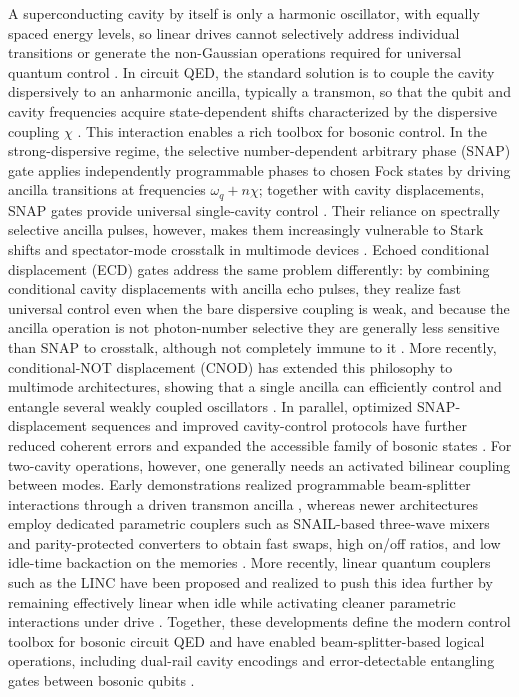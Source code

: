 A superconducting cavity by itself is only a harmonic oscillator, with equally spaced energy levels, so linear drives cannot selectively address individual transitions or generate the non-Gaussian operations required for universal quantum control \cite{Blais2021,Ma2021}. In circuit QED, the standard solution is to couple the cavity dispersively to an anharmonic ancilla, typically a transmon, so that the qubit and cavity frequencies acquire state-dependent shifts characterized by the dispersive coupling \(\chi\) \cite{Blais2021,Schuster2007}. This interaction enables a rich toolbox for bosonic control. In the strong-dispersive regime, the selective number-dependent arbitrary phase (SNAP) gate applies independently programmable phases to chosen Fock states by driving ancilla transitions at frequencies \(\omega_q+n\chi\); together with cavity displacements, SNAP gates provide universal single-cavity control \cite{Heeres2015,Krastanov2015}. Their reliance on spectrally selective ancilla pulses, however, makes them increasingly vulnerable to Stark shifts and spectator-mode crosstalk in multimode devices \cite{You2024,Ma2021}. Echoed conditional displacement (ECD) gates address the same problem differently: by combining conditional cavity displacements with ancilla echo pulses, they realize fast universal control even when the bare dispersive coupling is weak, and because the ancilla operation is not photon-number selective they are generally less sensitive than SNAP to crosstalk, although not completely immune to it \cite{Eickbusch2022,You2024}. More recently, conditional-NOT displacement (CNOD) has extended this philosophy to multimode architectures, showing that a single ancilla can efficiently control and entangle several weakly coupled oscillators \cite{Diringer2024,Copetudo2024}. In parallel, optimized SNAP-displacement sequences and improved cavity-control protocols have further reduced coherent errors and expanded the accessible family of bosonic states \cite{Kudra2022,Landgraf2024}. For two-cavity operations, however, one generally needs an activated bilinear coupling between modes. Early demonstrations realized programmable beam-splitter interactions through a driven transmon ancilla \cite{Gao2018,Zhang2019}, whereas newer architectures employ dedicated parametric couplers such as SNAIL-based three-wave mixers and parity-protected converters to obtain fast swaps, high on/off ratios, and low idle-time backaction on the memories \cite{Chapman2023,Lu2023}. More recently, linear quantum couplers such as the LINC have been proposed and realized to push this idea further by remaining effectively linear when idle while activating cleaner parametric interactions under drive \cite{Maiti2025,Pietikainen2024}. Together, these developments define the modern control toolbox for bosonic circuit QED and have enabled beam-splitter-based logical operations, including dual-rail cavity encodings and error-detectable entangling gates between bosonic qubits \cite{Teoh2023,Tsunoda2023}.

